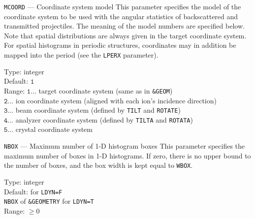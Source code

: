 \begin{keydescription}{\texttt{MCOORD} --- Coordinate system model}
%
  This parameter specifies the model of the coordinate system to be used with the angular
  statistics of backscattered and transmitted projectiles. The meaning of the model numbers 
  are specified below. Note that spatial distributions are
  always given in the target coordinate system. For spatial histograms in periodic structures, 
  coordinates may in addition be mapped into the period (see the \texttt{LPERX} parameter).
  \begin{keytab}
    Type:    \> integer \\
    Default: \> $\texttt{1}$ \\
    Range:   \> $\texttt{1} \ldots $ target coordinate system 
                (same as in \texttt{\&GEOM}) \\
             \> $\texttt{2} \ldots $ ion coordinate system 
                (aligned with each ion's incidence direction) \\
             \> $\texttt{3} \ldots $ beam coordinate system (defined by
                \texttt{TILT} and \texttt{ROTATE}) \\
             \> $\texttt{4} \ldots $ analyzer coordinate system (defined by 
                \texttt{TILTA} and \texttt{ROTATA}) \\
             \> $\texttt{5} \ldots $ crystal coordinate system
  \end{keytab}
\end{keydescription}

\begin{keydescription}{\texttt{NBOX} --- Maximum number of 1-D histogram boxes}
%
  This parameter specifies the maximum number of boxes in 1-D histograms. If
  zero, there is no upper bound to the number of boxes, and the box width is
  kept equal to \texttt{WBOX}.
  \begin{keytab}
    Type:    \> integer \\
    Default:  for \texttt{LDYN=F} \\
             \> \texttt{NBOX} of \texttt{\&GEOMETRY} for \texttt{LDYN=T} \\
    Range:   \> $\ge 0$
  \end{keytab}
\end{keydescription}

